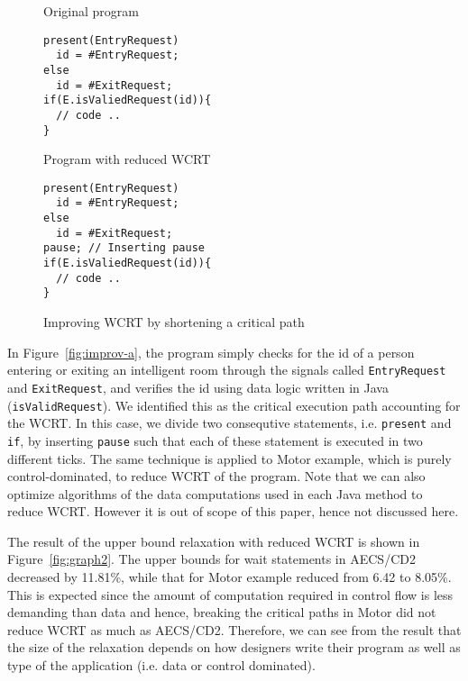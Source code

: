 \begin{figure}[h!]
	\centering
	\vspace{-10pt}
	\begin{SubFloat}{\label{fig:improv-a}Original program}
    \begin{minipage}[b]{0.45\linewidth}
		\begin{lstlisting}[style=sysj,morekeywords={present,emit,trap,pause,exit,delay,suspend}]
present(EntryRequest)
  id = #EntryRequest;
else
  id = #ExitRequest;
if(E.isValiedRequest(id)){
  // code ..
}
\end{lstlisting}
\end{minipage}
\end{SubFloat}
  \begin{SubFloat}{\label{fig:improv-b}Program with reduced WCRT}
    \centering
    \begin{minipage}[b]{0.45\linewidth}
		\begin{lstlisting}[style=sysj,morekeywords={emit,present,trap,pause,exit,delay,suspend}]
present(EntryRequest)
  id = #EntryRequest;
else
  id = #ExitRequest;
pause; // Inserting pause
if(E.isValiedRequest(id)){
  // code ..
}
\end{lstlisting}
		\end{minipage}
	\end{SubFloat}
	\caption{Improving WCRT by shortening a critical path}
	\label{fig:improv}
	\vspace{-10pt}
\end{figure}

In Figure~\ref{fig:improv-a}, the program simply checks for the id of a
person entering or exiting an intelligent room through the signals
called \texttt{EntryRequest} and \texttt{ExitRequest}, and verifies the
id using data logic written in Java (\texttt{isValidRequest}). We
identified this as the critical execution path accounting for the WCRT.
In this case, we divide two consequtive statements, i.e.
\texttt{present} and \texttt{if}, by inserting \texttt{pause} such that
each of these statement is executed in two different ticks. The same
technique is applied to Motor example, which is purely
control-dominated, to reduce WCRT of the program. Note that we can also
optimize algorithms of the data computations used in each Java method to
reduce WCRT. However it is out of scope of this paper, hence not
discussed here.

The result of the upper bound relaxation with reduced WCRT is shown in
Figure~\ref{fig:graph2}.  The upper bounds for wait statements in
AECS/CD2 decreased by 11.81\%, while that for Motor example reduced from
6.42 to 8.05\%. This is expected since the amount of computation
required in control flow is less demanding than data and hence, breaking
the critical paths in Motor did not reduce WCRT as much as AECS/CD2.
Therefore, we can see from the result that the size of the relaxation
depends on how designers write their program as well as type of the
application (i.e. data or control dominated).

